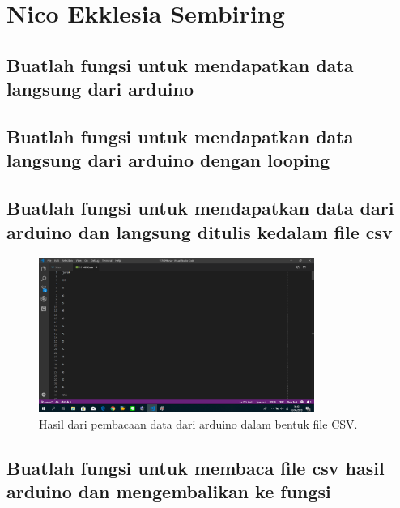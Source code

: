 
\section{Nico Ekklesia Sembiring}
\subsection{Buatlah fungsi untuk mendapatkan data langsung dari arduino}


\subsection{Buatlah fungsi untuk mendapatkan data langsung dari arduino dengan looping}


\subsection{Buatlah fungsi untuk mendapatkan data dari arduino dan langsung ditulis kedalam ﬁle csv}


\begin{figure}[H]
	\includegraphics[width=9cm]{figures/5/Praktek/1174096/hasilcsv.png}
	\caption{Hasil dari pembacaan data dari arduino dalam bentuk file CSV.}
	\centering
\end{figure}

\subsection{Buatlah fungsi untuk membaca ﬁle csv hasil arduino dan mengembalikan ke fungsi}


